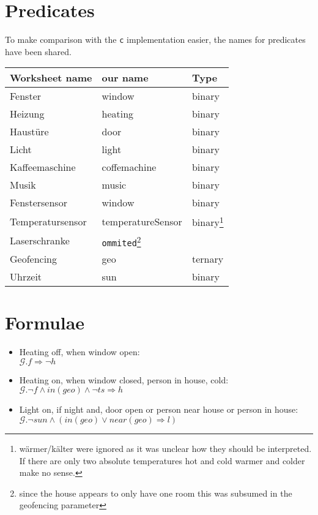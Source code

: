 \documentclass[11pt,english]{scrartcl}
\newcommand{\glob}{\ensuremath{\mathcal{G}}}
\begin{document}
\section{Predicates}
\label{sec:pred}
To make comparison with the \texttt{c} implementation easier, the names for predicates have been shared.\\

\begin{tabularx}{\linewidth}{l|l|l}
  Worksheet name & our name & Type \\ \hline
  Fenster & window & binary \\
  Heizung & heating & binary \\
  Haustüre & door & binary \\
  Licht & light & binary \\
  Kaffeemaschine & coffemachine & binary \\
  Musik & music & binary \\
  Fenstersensor & window & binary \\
  Temperatursensor & temperatureSensor & binary\footnote{wärmer/kälter were ignored as it was unclear how they should be interpreted. If there are only two absolute temperatures hot and cold warmer and colder make no sense.}\\
  Laserschranke & \texttt{ommited}\footnote{since the house appears to only have one room this was subsumed in the geofencing parameter}\\
  Geofencing & geo & ternary \\
  Uhrzeit & sun & binary
\end{tabularx}

\section{Formulae}
\label{sec:form}
\begin{itemize}
\item Heating off, when window open:\\
  \(\glob . f \Rightarrow \neg h\)
\item Heating on, when window closed, person in house, cold:\\
  \(\glob. \neg f \wedge in(geo)\wedge \neg ts \Rightarrow h\)
\item Light on, if night and,  door open or person near house or person in house:\\
  \(\glob. \neg sun \wedge (in(geo)\vee near(geo) \Rightarrow l)\)
\end{itemize}
\end{document}
